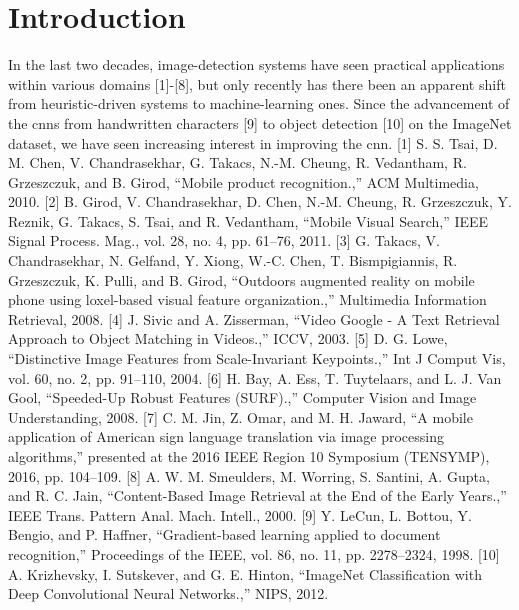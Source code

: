 \section{Introduction}

In the last two decades, image-detection systems have seen practical applications within various domains [1]-[8], but only recently has there been an apparent shift from heuristic-driven systems to machine-learning ones. Since the advancement of the \glspl{cnn} from handwritten characters [9] to object detection [10] on the ImageNet dataset, we have seen increasing interest in improving the \gls{cnn}.
[1]	S. S. Tsai, D. M. Chen, V. Chandrasekhar, G. Takacs, N.-M. Cheung, R. Vedantham, R. Grzeszczuk, and B. Girod, “Mobile product recognition.,” ACM Multimedia, 2010.
[2]	B. Girod, V. Chandrasekhar, D. Chen, N.-M. Cheung, R. Grzeszczuk, Y. Reznik, G. Takacs, S. Tsai, and R. Vedantham, “Mobile Visual Search,” IEEE Signal Process. Mag., vol. 28, no. 4, pp. 61–76, 2011.
[3]	G. Takacs, V. Chandrasekhar, N. Gelfand, Y. Xiong, W.-C. Chen, T. Bismpigiannis, R. Grzeszczuk, K. Pulli, and B. Girod, “Outdoors augmented reality on mobile phone using loxel-based visual feature organization.,” Multimedia Information Retrieval, 2008.
[4]	J. Sivic and A. Zisserman, “Video Google - A Text Retrieval Approach to Object Matching in Videos.,” ICCV, 2003.
[5]	D. G. Lowe, “Distinctive Image Features from Scale-Invariant Keypoints.,” Int J Comput Vis, vol. 60, no. 2, pp. 91–110, 2004.
[6]	H. Bay, A. Ess, T. Tuytelaars, and L. J. Van Gool, “Speeded-Up Robust Features (SURF).,” Computer Vision and Image Understanding, 2008.
[7]	C. M. Jin, Z. Omar, and M. H. Jaward, “A mobile application of American sign language translation via image processing algorithms,” presented at the 2016 IEEE Region 10 Symposium (TENSYMP), 2016, pp. 104–109.
[8]	A. W. M. Smeulders, M. Worring, S. Santini, A. Gupta, and R. C. Jain, “Content-Based Image Retrieval at the End of the Early Years.,” IEEE Trans. Pattern Anal. Mach. Intell., 2000.
[9]	Y. LeCun, L. Bottou, Y. Bengio, and P. Haffner, “Gradient-based learning applied to document recognition,” Proceedings of the IEEE, vol. 86, no. 11, pp. 2278–2324, 1998.
[10]	A. Krizhevsky, I. Sutskever, and G. E. Hinton, “ImageNet Classification with Deep Convolutional Neural Networks.,” NIPS, 2012.
